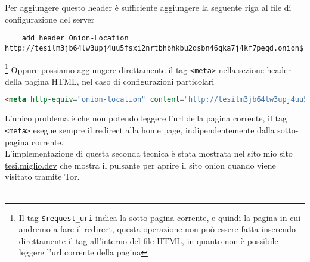 \newpage
Per aggiungere questo header è sufficiente aggiungere la seguente riga al file di configurazione del server
\begin{lstlisting}
    add_header Onion-Location http://tesilm3jb64lw3upj4uu5fsxi2nrtbhbhkbu2dsbn46qka7j4kf7peqd.onion$request_uri;
\end{lstlisting}
\footnote{Il tag \lstinline{$request_uri} indica la sotto-pagina corrente, e quindi la pagina in cui andremo a fare il redirect, questa operazione non può essere fatta inserendo direttamente il tag all'interno del file HTML, in quanto non è possibile leggere l'url corrente della pagina}
Oppure possiamo aggiungere direttamente il tag \lstinline{<meta>} nella sezione header della pagina HTML, nel caso di configurazioni particolari 
\begin{lstlisting}[language=HTML]
    <meta http-equiv="onion-location" content="http://tesilm3jb64lw3upj4uu5fsxi2nrtbhbhkbu2dsbn46qka7j4kf7peqd.onion" />
\end{lstlisting}
L'unico problema è che non potendo leggere l'url della pagina corrente, il tag \lstinline{<meta>} esegue sempre il redirect alla home page, indipendentemente dalla sotto-pagina corrente. \\
L'implementazione di questa seconda tecnica è stata mostrata nel sito mio sito \href{https://tesi.miglio.dev}{tesi.miglio.dev} che mostra il pulsante per aprire il sito onion quando viene visitato tramite Tor. \\
\cite{OnionLocationHeader} \\

